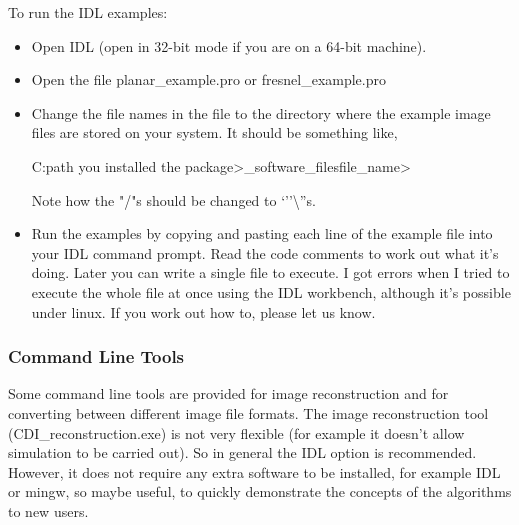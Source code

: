 \documentclass[]{cxs-software}
\begin{document}
To run the IDL examples:
\begin{itemize}
\item Open IDL (open in 32-bit mode if you are on a 64-bit machine).
\item Open the file planar\_example.pro or fresnel\_example.pro
\item Change the file names in the file to the directory where the
  example image files are stored on your system. It should be
  something like,
  \begin{myverbatim}
    C:\<path you installed the package>\cxs_software\examples\image_files\<file_name>
  \end{myverbatim}
     Note how the "/"s should be changed to `''\textbackslash''s.
   \item Run the examples by copying and pasting each line of the
     example file into your IDL command prompt. Read the code comments
     to work out what it's doing. Later you can write a single file to
     execute. I got errors when I tried to execute the whole file at
     once using the IDL workbench, although it's possible under
     linux. If you work out how to, please let us know.
\end{itemize}


\subsubsection{Command Line Tools}

Some command line tools are provided for image reconstruction and for
converting between different image file formats. The image
reconstruction tool (CDI\_reconstruction.exe) is not very flexible
(for example it doesn't allow simulation to be carried out). So in
general the IDL option is recommended.  However, it does not require
any extra software to be installed, for example IDL or mingw, so maybe
useful, to quickly demonstrate the concepts of the algorithms to new
users.
\end{document}
